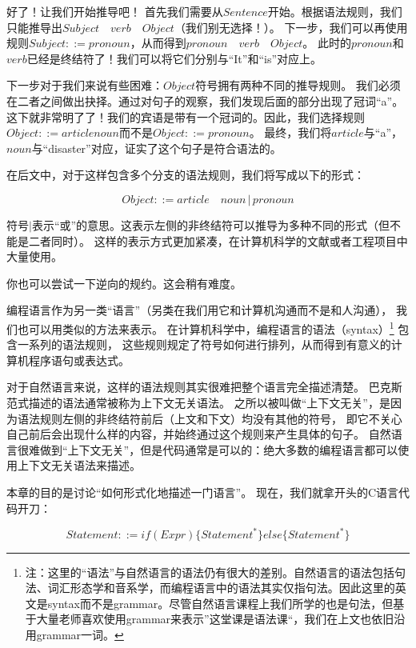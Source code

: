 \documentclass[../main.tex]{subfiles}
\begin{document}
    \indent 好了！让我们开始推导吧！
    首先我们需要从$Sentence$开始。根据语法规则，我们只能推导出$Subject\quad verb\quad Object$（我们别无选择！）。
    下一步，我们可以再使用规则$Subject ::= pronoun$，从而得到$pronoun\quad verb\quad Object$。
    此时的$pronoun$和$verb$已经是终结符了！我们可以将它们分别与“It”和“is”对应上。

    \indent 下一步对于我们来说有些困难：$Object$符号拥有两种不同的推导规则。
    我们必须在二者之间做出抉择。通过对句子的观察，我们发现后面的部分出现了冠词“a”。
    这下就非常明了了！我们的宾语是带有一个冠词的。因此，我们选择规则 $Object ::= article noun$而不是$Object ::= pronoun$。
    最终，我们将$article$与“a”，$noun$与“disaster”对应，证实了这个句子是符合语法的。

    \indent 在后文中，对于这样包含多个分支的语法规则，我们将写成以下的形式：

    $$Object ::= article\quad noun\,|\,pronoun$$

    \indent 符号$|$表示“或”的意思。这表示左侧的非终结符可以推导为多种不同的形式（但不能是二者同时）。
    这样的表示方式更加紧凑，在计算机科学的文献或者工程项目中大量使用。

    \indent 你也可以尝试一下逆向的规约。这会稍有难度。
    \newline
  
  \indent 编程语言作为另一类“语言”（另类在我们用它和计算机沟通而不是和人沟通），
  我们也可以用类似的方法来表示。
  在计算机科学中，编程语言的语法（syntax）\footnote[1]{注：这里的“语法”与自然语言的语法仍有很大的差别。自然语言的语法包括句法、词汇形态学和音系学\cite{grammar}，而编程语言中的语法其实仅指句法。因此这里的英文是syntax而不是grammar。尽管自然语言课程上我们所学的也是句法，但基于大量老师喜欢使用grammar来表示”这堂课是语法课“，我们在上文也依旧沿用grammar一词。}
  包含一系列的语法规则，
  这些规则规定了符号如何进行排列，从而得到有意义的计算机程序语句或表达式。\cite{syntaxwiki}
  
  \indent 对于自然语言来说，这样的语法规则其实很难把整个语言完全描述清楚。
  巴克斯范式描述的语法通常被称为上下文无关语法。
  之所以被叫做“上下文无关”，是因为语法规则左侧的非终结符前后（上文和下文）均没有其他的符号，
  即它不关心自己前后会出现什么样的内容，并始终通过这个规则来产生具体的句子。
  自然语言很难做到“上下文无关”，但是代码通常是可以的：绝大多数的编程语言都可以使用上下文无关语法来描述。\cite{cfgwiki}

  \indent 本章的目的是讨论“如何形式化地描述一门语言”。
  现在，我们就拿开头的C语言代码开刀：

  $$
  Statement ::= if(Expr)\{ Statement^*\} else\{Statement^*\}
  $$
\end{document}
